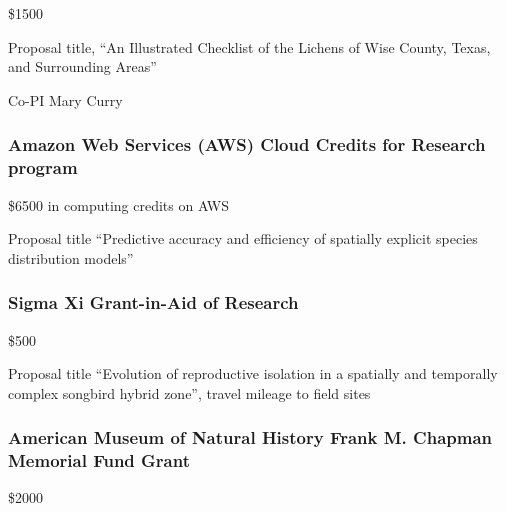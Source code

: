\documentclass[
  letterpaper,
  DIV=11,
  numbers=noendperiod,
  oneside]{scrreprt}
\begin{document}
\$1500


Proposal title, ``An Illustrated Checklist of the Lichens of Wise
County, Texas, and Surrounding Areas''

Co-PI Mary Curry

\subsubsection{Amazon Web Services (AWS) Cloud Credits for Research
program}\label{amazon-web-services-aws-cloud-credits-for-research-program}

\$6500 in computing credits on AWS


Proposal title ``Predictive accuracy and efficiency of spatially
explicit species distribution models''

\subsubsection{Sigma Xi Grant-in-Aid of
Research}\label{sigma-xi-grant-in-aid-of-research}

\$500


Proposal title ``Evolution of reproductive isolation in a spatially and
temporally complex songbird hybrid zone'', travel mileage to field sites

\subsubsection{American Museum of Natural History Frank M. Chapman
Memorial Fund
Grant}\label{american-museum-of-natural-history-frank-m.-chapman-memorial-fund-grant}

\$2000

\end{document}
